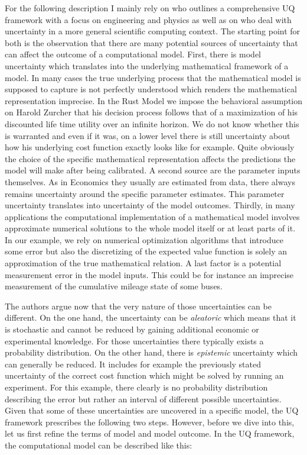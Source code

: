 For the following description I mainly rely on \cite{Smith.2013} who outlines a comprehensive UQ framework with a focus on engineering and physics as well as on \cite{Oberkampf.2010} who deal with uncertainty in a more general scientific computing context.  The starting point for both is the observation that there are many potential sources of uncertainty that can affect the outcome of a computational model. First, there is model uncertainty which translates into the underlying mathematical framework of a model. In many cases the true underlying process that the mathematical model is supposed to capture is not perfectly understood which renders the mathematical representation imprecise. In the Rust Model we impose the behavioral assumption on Harold Zurcher that his decision process follows that of a maximization of his discounted life time utility over an infinite horizon. We do not know whether this is warranted and even if it was, on a lower level there is still uncertainty about how his underlying cost function exactly looks like for example. Quite obviously the choice of the specific mathematical representation affects the predictions the model will make after being calibrated. A second source are the parameter inputs themselves. As in Economics they usually are estimated from data, there always remains uncertainty around the specific parameter estimates. This parameter uncertainty translates into uncertainty of the model outcomes. Thirdly, in many applications the computational implementation of a mathematical model involves approximate numerical solutions to the whole model itself or at least parts of it. In our example, we rely on numerical optimization algorithms that introduce some error but also the discretizing of the expected value function is solely an approximation of the true mathematical relation. A last factor is a potential measurement error in the model inputs. This could be for instance an imprecise measurement of the cumulative mileage state of some buses.

The authors argue now that the very nature of those uncertainties can be different. On the one hand, the uncertainty can be \textit{aleatoric} which means that it is stochastic and cannot be reduced by gaining additional economic or experimental knowledge. For those uncertainties there typically exists a probability distribution. On the other hand, there is \textit{epistemic} uncertainty which can generally be reduced. It includes for example the previously stated uncertainty of the correct cost function which might be solved by running an experiment. For this example, there clearly is no probability distribution describing the error but rather an interval of different possible uncertainties. Given that some of these uncertainties are uncovered in a specific model, the UQ framework prescribes the following two steps. However, before we dive into this, let us first refine the terms of model and model outcome. In the UQ framework, the computational model can be described like this:

